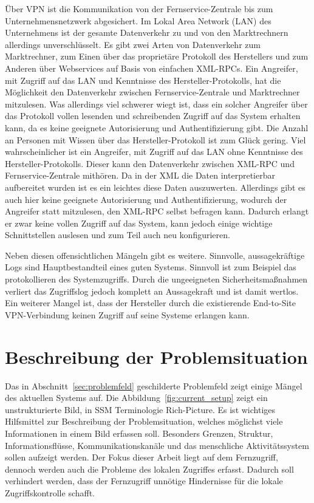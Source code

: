 \documentclass[11pt,a4paper]{report}
\begin{document}
Über VPN ist die Kommunikation von der Fernservice-Zentrale bis zum Unternehmensnetzwerk abgesichert. Im Lokal Area Network (LAN) des Unternehmens ist der gesamte Datenverkehr zu und von den Marktrechnern allerdings unverschlüsselt. Es gibt zwei Arten von Datenverkehr zum Marktrechner, zum Einen über das proprietäre Protokoll des Herstellers und zum Anderen über Webservices auf Basis von einfachen XML-RPCs. Ein Angreifer, mit Zugriff auf das LAN und Kenntnisse des Hersteller-Protokolls, hat die Möglichkeit den Datenverkehr zwischen Fernservice-Zentrale und Marktrechner mitzulesen. Was allerdings viel schwerer wiegt ist, dass ein solcher Angreifer über das Protokoll vollen lesenden und schreibenden Zugriff auf das System erhalten kann, da es keine geeignete Autorisierung und Authentifizierung gibt. Die Anzahl an Personen mit Wissen über das Hersteller-Protokoll ist zum Glück gering. Viel wahrscheinlicher ist ein Angreifer, mit Zugriff auf das LAN ohne Kenntnisse des Hersteller-Protokolls. Dieser kann den Datenverkehr zwischen XML-RPC und Fernservice-Zentrale mithören. Da in der XML die Daten interpretierbar aufbereitet wurden ist es ein leichtes diese Daten auszuwerten. Allerdings gibt es auch hier keine geeignete Autorisierung und Authentifizierung, wodurch der Angreifer statt mitzulesen, den XML-RPC selbst befragen kann. Dadurch erlangt er zwar keine vollen Zugriff auf das System, kann jedoch einige wichtige Schnittstellen auslesen und zum Teil auch neu konfigurieren. 

Neben diesen offensichtlichen Mängeln gibt es weitere. Sinnvolle, aussagekräftige Logs sind Hauptbestandteil eines guten Systems. Sinnvoll ist zum Beispiel das protokollieren des Systemzugriffs. Durch die ungeeigneten Sicherheitsmaßnahmen verliert das Zugriffslog jedoch komplett an Aussagekraft und ist damit wertlos. Ein weiterer Mangel ist, dass der Hersteller durch die existierende End-to-Site VPN-Verbindung keinen Zugriff auf seine Systeme erlangen kann. 


\section{Beschreibung der Problemsituation} \label{sec:problem_situation}

Das in Abschnitt~\ref{sec:problemfeld} geschilderte Problemfeld zeigt einige Mängel des aktuellen Systems auf. Die Abbildung~\ref{fig:current_setup} zeigt ein unstrukturierte Bild, in SSM Terminologie Rich-Picture. Es ist wichtiges Hilfsmittel zur Beschreibung der Problemsituation, welches möglichst viele Informationen in einem Bild erfassen soll. Besonders Grenzen, Struktur, Informationsflüsse, Kommunikationskanäle und das menschliche Aktivitätssystem sollen aufzeigt werden\cite{ssmger}. Der Fokus dieser Arbeit liegt auf dem Fernzugriff, dennoch werden auch die Probleme des lokalen Zugriffes erfasst. Dadurch soll verhindert werden, dass der Fernzugriff unnötige Hindernisse für die lokale Zugriffskontrolle schafft. 
\end{document}
